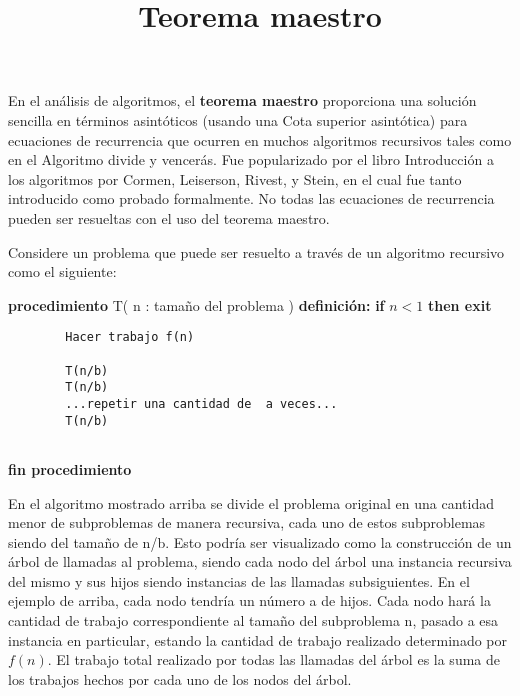 \documentclass[12pt]{article} %
\begin{document}
\title{Teorema maestro}
\hrulefill
\justify En el análisis de algoritmos, el \textbf{teorema maestro} proporciona una solución sencilla en términos asintóticos (usando una Cota superior asintótica) para ecuaciones de recurrencia que ocurren en muchos algoritmos recursivos tales como en el Algoritmo divide y vencerás. Fue popularizado por el libro Introducción a los algoritmos por Cormen, Leiserson, Rivest, y Stein, en el cual fue tanto introducido como probado formalmente. No todas las ecuaciones de recurrencia pueden ser resueltas con el uso del teorema maestro.

\tableofcontents


\justify Considere un problema que puede ser resuelto a través de un algoritmo recursivo como el siguiente:

\begin{shaded*}
    
\hspace{-0.75cm}\textbf{procedimiento} T( n : tamaño del problema ) \textbf{definición:}\newline
    \hspace{1cm}\textbf{if} $n < 1$ \textbf{then exit}
        
\begin{verbatim}
        Hacer trabajo f(n)

        T(n/b)
        T(n/b)
        ...repetir una cantidad de  a veces...
        T(n/b)
    
\end{verbatim}
    \hspace{0.5cm}\textbf{fin procedimiento }
\end{shaded*}

\justify En el algoritmo mostrado arriba se divide el problema original en una cantidad menor de subproblemas de manera recursiva, cada uno de estos subproblemas siendo del tamaño de n/b. Esto podría ser visualizado como la construcción de un árbol de llamadas al problema, siendo cada nodo del árbol una instancia recursiva del mismo y sus hijos siendo instancias de las llamadas subsiguientes. En el ejemplo de arriba, cada nodo tendría un número a de hijos. Cada nodo hará la cantidad de trabajo correspondiente al tamaño del subproblema n, pasado a esa instancia en particular, estando la cantidad de trabajo realizado determinado por $f(n)$. El trabajo total realizado por todas las llamadas del árbol es la suma de los trabajos hechos por cada uno de los nodos del árbol.\\
\end{document}
